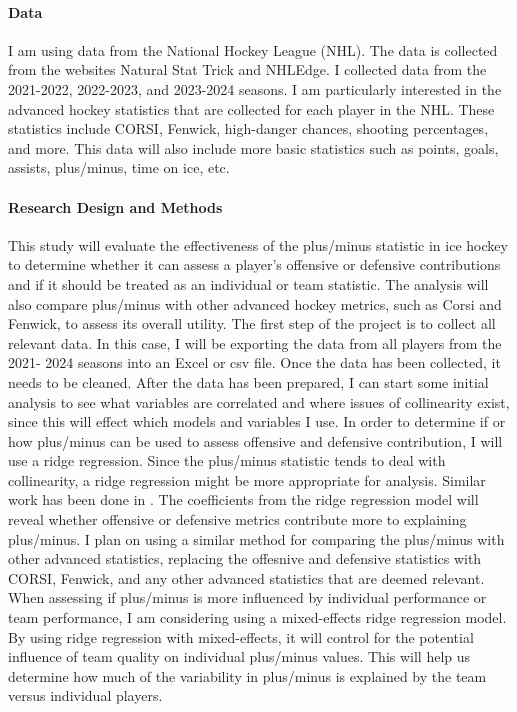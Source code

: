 \documentclass[12pt]{article}
\begin{document}
\paragraph{Data}

I am using data from the National Hockey League (NHL). The data is collected from the websites Natural Stat Trick and NHLEdge. 
I collected data from the 2021-2022, 2022-2023, and 2023-2024 seasons. I am particularly interested in the advanced hockey 
statistics that are collected for each player in the NHL. These statistics include CORSI, Fenwick, high-danger chances,
shooting percentages, and more. This data will also include more basic statistics such as points, goals, assists, plus/minus,
time on ice, etc.



\paragraph{Research Design and Methods}
This study will evaluate the effectiveness of the plus/minus statistic in ice hockey to determine whether it can assess a 
player's offensive or defensive contributions and if it should be treated as an individual or team statistic. The analysis 
will also compare plus/minus with other advanced hockey metrics, such as Corsi and Fenwick, to assess its overall utility.
The first step of the project is to collect all relevant data. In this case, I will be exporting the data from all players
from the 2021- 2024 seasons into an Excel or csv file. Once the data has been collected, it needs to be cleaned. After the
data has been prepared, I can start some initial analysis to see what variables are correlated and where issues of collinearity 
exist, since this will effect which models and variables I use. 
In order to determine if or how plus/minus can be used to assess offensive and defensive contribution, I will use a ridge 
regression. Since the plus/minus statistic tends to deal with collinearity, a ridge regression might be more appropriate for 
analysis. Similar work has been done in \cite{Macdonald_2012}. The coefficients from the ridge regression model will reveal 
whether offensive or defensive metrics contribute more to explaining plus/minus. I plan on using a similar method for comparing
the plus/minus with other advanced statistics, replacing the offesnive and defensive statistics with CORSI, Fenwick, and any other
advanced statistics that are deemed relevant. When assessing if plus/minus is more influenced by individual performance or team 
performance, I am considering using a mixed-effects ridge regression model. By using ridge regression with mixed-effects, it will 
control for the potential influence of team quality on individual plus/minus values. This will help us determine how much of the 
variability in plus/minus is explained by the team versus individual players.
\end{document}
